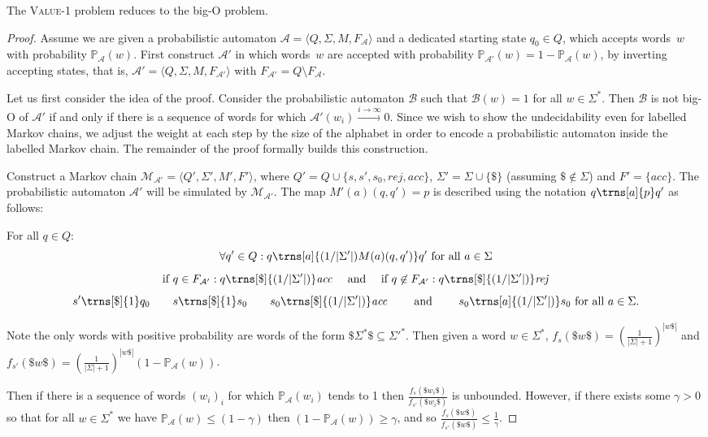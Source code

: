 \documentclass{lmcs}
\theoremstyle{plain}
\theoremstyle{definition}
\theoremstyle{remark}
\newcommand\acc{\mathit{acc}}
\newcommand\rej{\mathit{rej}}
\newcommand\abra[1]{\langle #1 \rangle}
\newcommand\lmc{\mathcal{M}}
\newcommand\pr{\mathbb{P}}
\newcommand\pa{\mathcal{A}}
\renewcommand\nu{f}
\begin{document}
\begin{prop}\label{prop:v1tobigo}
The \textsc{Value-1} problem reduces to the big-O problem.
\end{prop}
\begin{proof} 

Assume we are given a probabilistic automaton $\pa = \abra{Q,\Sigma,M,F_{\pa}}$ and a dedicated starting state $q_0 \in Q$, which accepts words~$w$ with probability $\pr_\pa(w)$. First construct $\pa'$ in which words~$w$ are accepted with probability $\pr_{\pa'}(w) = 1 - \pr_\pa(w)$, by inverting accepting states, that is, $\pa' = \abra{Q,\Sigma,M,F_{\pa'}}$ with $F_{\pa'}= Q\setminus F_{\pa} $.

Let us first consider the idea of the proof. Consider the probabilistic automaton $\mathcal{B}$ such that $\mathcal{B}(w) = 1$ for all $w\in\Sigma^*$. Then $\mathcal{B}$ is not big-O of $\pa'$ if and only if there is a sequence of words for which $\pa'(w_i) \xrightarrow{i\to\infty} 0$. Since we wish to show the undecidability even for labelled Markov chains, we adjust the weight at each step by the size of the alphabet in order to encode a probabilistic automaton inside the labelled Markov chain. The remainder of the proof formally builds this construction.

Construct a Markov chain $ \lmc_{\pa'} = \abra{Q',\Sigma', M', F'}$, where $Q' =Q \cup \{s, s', s_0, \rej, \acc\}$, $\Sigma' = \Sigma \cup \{\$\}$ (assuming $\$\not\in\Sigma$) and $F' =\{\acc\}$. The probabilistic automaton $\pa'$ will be simulated by $\lmc_{\pa'}$. The map  $M'(a)(q,q')= p$ is described using the notation $q\trns[a]{p}q'$ as follows:

For all $q\in Q:$
\[
  \forall q' \in Q: q\trns[a]{(1/|\Sigma'|)M(a)(q,q')} q' \text{ for all } a\in \Sigma
\]
\[
\text{if }q \in F_{{\pa'}}: q\trns[\$]{(1/|\Sigma'|)} \acc \quad \text{ and }  \quad \text{if } q \not\in F_{{\pa'}}: q\trns[\$]{(1/|\Sigma'|)} \rej
\]
\[
  s' \trns[\$]{1} q_0 \quad\quad s \trns[\$]{1} s_0  \quad\quad s_0\trns[\$]{(1/|\Sigma'|)} \acc\quad\quad \text{ and }\quad\quad s_0\trns[a]{(1/|\Sigma'|)} s_0 \text{ for all } a\in \Sigma.
\]

Note the only words with positive probability are words of the form $\$ \Sigma^* \$ \subseteq \Sigma'^* $. Then given a word $w\in \Sigma^*$,
$\nu_s(\$ w\$) =\left(\frac{1}{|\Sigma| + 1}\right)^{|w\$|}$ and $\nu_{s'}(\$ w\$) = \left(\frac{1}{|\Sigma| + 1}\right)^{|w\$|}(1-\pr_\pa(w))$.

Then if there is a sequence of words $(w_i)_i$ for which $\pr_\pa(w_i)$ tends to 1 then $\frac{ \nu_s(\$w_i\$)}{ \nu_{s'}(\$w_i\$)} $ is unbounded. However, if there exists some $\gamma > 0$ so that for all $w \in \Sigma^*$ we have $  \pr_\pa(w) \le (1-\gamma)$ then $(1- \pr_\pa(w)) \ge \gamma$, and so $\frac{ \nu_s(\$w\$)}{ \nu_{s'}(\$w\$)}  \le \frac{1}{\gamma}$.
\end{proof}
\end{document}
